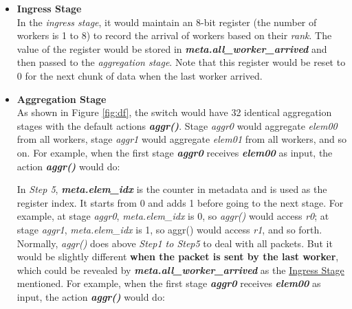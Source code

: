 \documentclass[a4paper,11pt]{article}
\begin{document}
\begin{itemize}
    \item \textbf{Ingress Stage} \\
    \label{ingstg}
    In the \textit{ingress stage}, it would maintain an 8-bit register (the number of workers is 1 to 8) to record the arrival of workers based on their \textit{rank}. The value of the register would be stored in \textit{\textbf{meta.all\_worker\_arrived}} and then passed to the \textit{aggregation stage}. Note that this register would be reset to 0 for the next chunk of data when the last worker arrived.
    \item \textbf{Aggregation Stage} \\
    \label{aggstg}
    As shown in Figure \ref{fig:df}, the switch would have 32 identical aggregation stages with the default actions \textbf{\textit{aggr()}}. Stage \textit{aggr0} would aggregate \textit{elem00} from all workers, stage \textit{aggr1} would aggregate \textit{elem01} from all workers, and so on. For example, when the first stage \textit{\textbf{aggr0}} receives \textit{\textbf{elem00}} as input, the action \textbf{\textit{aggr()}} would do:
    In \textit{Step 5}, \textbf{\textit{meta.elem\_idx}} is the counter in metadata and is used as the register index. It starts from 0 and adds 1 before going to the next stage. For example, at stage \textit{aggr0}, \textit{meta.elem\_idx} is 0, so \textit{aggr()} would access \textit{r0}; at stage \textit{aggr1}, \textit{meta.elem\_idx} is 1, so aggr() would access \textit{r1}, and so forth. \\
    Normally, \textit{aggr()} does above \textit{Step1 to Step5} to deal with all packets. But it would be slightly different \textbf{when the packet is sent by the last worker}, which could be revealed by \textbf{\textit{meta.all\_worker\_arrived}} as the \hyperref[ingstg]{Ingress Stage} mentioned. For example, when the first stage \textit{\textbf{aggr0}} receives \textit{\textbf{elem00}} as input, the action \textbf{\textit{aggr()}} would do:

\end{itemize}
\end{document}

